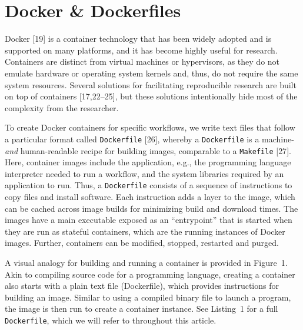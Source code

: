 \documentclass[10pt,letterpaper]{article}
\begin{document}
\hypertarget{docker-dockerfiles}{%
\section{Docker \& Dockerfiles}\label{docker-dockerfiles}}

Docker {[}19{]} is a container technology that has been widely adopted
and is supported on many platforms, and it has become highly useful for
research. Containers are distinct from virtual machines or hypervisors,
as they do not emulate hardware or operating system kernels and, thus,
do not require the same system resources. Several solutions for
facilitating reproducible research are built on top of containers
{[}17,22--25{]}, but these solutions intentionally hide most of the
complexity from the researcher.

To create Docker containers for specific workflows, we write text files
that follow a particular format called \texttt{Dockerfile} {[}26{]},
whereby a \texttt{Dockerfile} is a machine- \emph{and} human-readable
recipe for building images, comparable to a \texttt{Makefile} {[}27{]}.
Here, container images include the application, e.g., the programming
language interpreter needed to run a workflow, and the system libraries
required by an application to run. Thus, a \texttt{Dockerfile} consists
of a sequence of instructions to copy files and install software. Each
instruction adds a layer to the image, which can be cached across image
builds for minimizing build and download times. The images have a main
executable exposed as an ``entrypoint'' that is started when they are
run as stateful containers, which are the running instances of Docker
images. Further, containers can be modified, stopped, restarted and
purged.

A visual analogy for building and running a container is provided in
Figure~1. Akin to compiling source code for a programming language,
creating a container also starts with a plain text file (Dockerfile),
which provides instructions for building an image. Similar to using a
compiled binary file to launch a program, the image is then run to
create a container instance. See Listing~1 for a full
\texttt{Dockerfile}, which we will refer to throughout this article.
\end{document}
